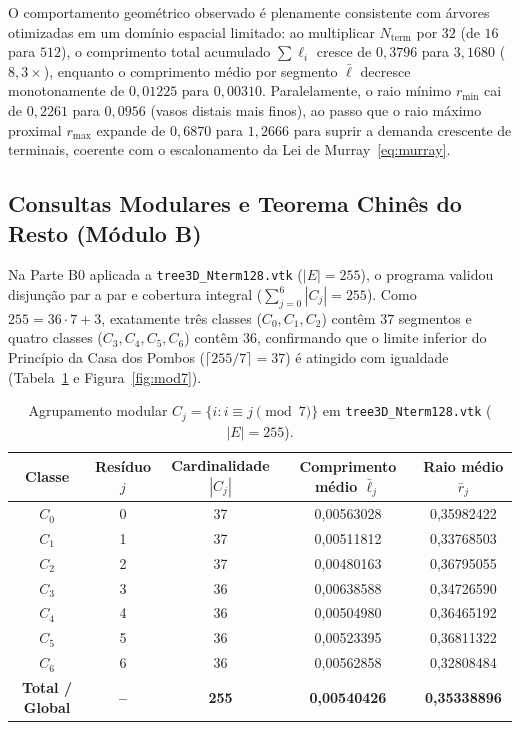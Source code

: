 \documentclass[11pt, a4paper]{article}
\begin{document}
O comportamento geométrico observado é plenamente consistente com árvores otimizadas em um domínio espacial limitado: ao multiplicar $N_{\mathrm{term}}$ por $32$ (de $16$ para $512$), o comprimento total acumulado $\sum \ell_i$ cresce de $0{,}3796$ para $3{,}1680$ ($8{,}3\times$), enquanto o comprimento médio por segmento $\bar{\ell}$ decresce monotonamente de $0{,}01225$ para $0{,}00310$. Paralelamente, o raio mínimo $r_{\min}$ cai de $0{,}2261$ para $0{,}0956$ (vasos distais mais finos), ao passo que o raio máximo proximal $r_{\max}$ expande de $0{,}6870$ para $1{,}2666$ para suprir a demanda crescente de terminais, coerente com o escalonamento da Lei de Murray~\eqref{eq:murray}.

\subsection{Consultas Modulares e Teorema Chinês do Resto (Módulo B)}

Na Parte B0 aplicada a \texttt{tree3D\_Nterm128.vtk} ($|E| = 255$), o programa validou disjunção par a par e cobertura integral ($\sum_{j=0}^{6} |C_j| = 255$). Como $255 = 36\cdot 7 + 3$, exatamente três classes ($C_0, C_1, C_2$) contêm $37$ segmentos e quatro classes ($C_3, C_4, C_5, C_6$) contêm $36$, confirmando que o limite inferior do Princípio da Casa dos Pombos ($\lceil 255/7 \rceil = 37$) é atingido com igualdade (Tabela~\ref{tab:mod7} e Figura~\ref{fig:mod7}).

\begin{table}[htbp]
  \centering
  \small
  \caption{Agrupamento modular $C_j = \{i : i \equiv j \pmod 7\}$ em \texttt{tree3D\_Nterm128.vtk} ($|E| = 255$).}
  \label{tab:mod7}
  \begin{tabular}{ccccc}
    \toprule
    \textbf{Classe} & \textbf{Resíduo $j$} & \textbf{Cardinalidade $|C_j|$} & \textbf{Comprimento médio $\bar{\ell}_j$} & \textbf{Raio médio $\bar{r}_j$} \\
    \midrule
    $C_0$ & 0 & 37 & 0,00563028 & 0,35982422 \\
    $C_1$ & 1 & 37 & 0,00511812 & 0,33768503 \\
    $C_2$ & 2 & 37 & 0,00480163 & 0,36795055 \\
    $C_3$ & 3 & 36 & 0,00638588 & 0,34726590 \\
    $C_4$ & 4 & 36 & 0,00504980 & 0,36465192 \\
    $C_5$ & 5 & 36 & 0,00523395 & 0,36811322 \\
    $C_6$ & 6 & 36 & 0,00562858 & 0,32808484 \\
    \midrule
    \textbf{Total / Global} & \textbf{--} & \textbf{255} & \textbf{0,00540426} & \textbf{0,35338896} \\
    \bottomrule
  \end{tabular}
\end{table}
\end{document}
